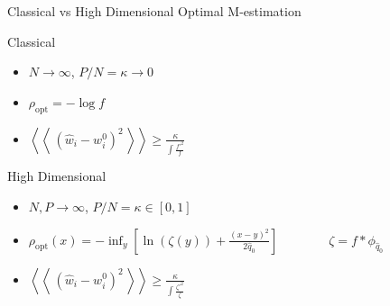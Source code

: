 \documentclass[pdf]{beamer}
\newcommand{\qav}[1]{\mbox{$\left\langle\left\langle \, #1 \, \right\rangle\right\rangle$}}
\newcommand{\ra}{\rightarrow}
\begin{document}
\begin{frame}[t]{Classical vs High Dimensional Optimal M-estimation}


    \begin{block}{Classical}
        \begin{itemize}
        \item $N\ra \infty$, $P/N =\kappa \ra 0$
        \vspace{.1in}
        \item $\rho_{\text{opt}} = -\log f$
        \vspace{.1in}
        \item $\qav{(\hat{w}_i-w^0_i)^2} \ge \frac{\kappa}{\int{\frac{f'^2}{f}}}$
        \vspace{.1in}
        \end{itemize}

    \end{block}


    \begin{block}{High Dimensional}
        \begin{itemize}
        \item $N,P\ra \infty$, $P/N =\kappa \in [0,1]$
        \vspace{.1in}
        \item $\rho_{\text{opt}}(x) = -\inf_y{\left[\ln(\zeta(y))+\frac{(x-y)^2}{2 \hat{q}_0}\right]} \quad \quad \quad \quad \zeta = f*\phi_{\hat{q}_0}$
        \vspace{.1in}
        \item $\qav{(\hat{w}_i-w^0_i)^2} \ge \frac{\kappa}{\int{\frac{\zeta'^2}{\zeta}}}$
        \vspace{.1in}
        \end{itemize}
    \end{block}
\end{frame}
\end{document}
